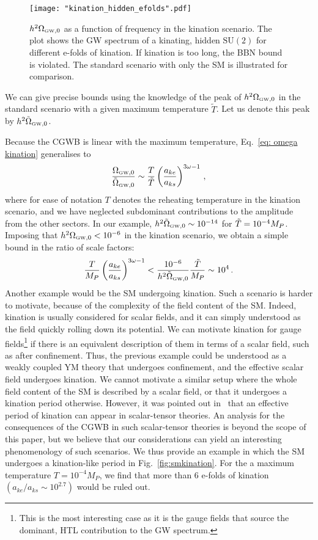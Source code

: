 \documentclass[a4paper,11pt]{article}
\newcommand{\lr}[1]{\left(#1\right)}
\newcommand{\tti}[1]{\text{\tiny{#1}}}
\begin{document}
\begin{figure}[t!]
\centerline{\texttt{[image: "kination\_hidden\_efolds".pdf]}}
\caption{$h^2 \Omega_{\tti{GW},0}$ as a function of frequency in the kination scenario. The plot shows the GW spectrum of a kinating, hidden $\text{SU}(2)$ for different e-folds of kination. If kination is too long, the BBN bound is violated. The standard scenario with only the SM is illustrated for comparison. }
\label{fig: kination and bounds}
\end{figure}

We can give precise bounds using the knowledge of the peak of $h^2\Omega_{\tti{GW},0}$ in the standard scenario with a given maximum temperature $\tilde{T}$. Let us denote this peak by $h^2\tilde{\Omega}_{\tti{GW},0}$.

Because the CGWB is linear with the maximum temperature, Eq.~\eqref{eq: omega kination} generalises to
\begin{equation}\label{eq: omega kination 2}
    \frac{ \Omega_{\tti{GW},0}}{ \tilde{\Omega}_{\tti{GW},0}} \sim \frac{T}{\Tilde{T}}\lr{\frac{a_{ke}}{a_{ks}}}^{3\omega-1} \, ,
\end{equation}
where for ease of notation $T$ denotes the reheating temperature in the kination scenario, and we have neglected subdominant contributions to the amplitude from the other sectors. 
In our example, $h^2\tilde{\Omega}_{\tti{GW},0}\sim 10^{-14}$
for $\Tilde{T}=10^{-4}M_{P}$. 
Imposing that $h^2 \Omega_{\tti{GW},0}<10^{-6}$ in the kination scenario, we obtain a simple bound in the ratio of scale factors:
\begin{equation}
    \frac{T}{M_{P}}\lr{\frac{a_{ke}}{a_{ks}}}^{3\omega-1}< \frac{10^{-6}}{h^2\tilde{\Omega}_{\tti{GW},0}}\frac{\tilde T}{M_{P}}\sim10^4 \, .
\end{equation}
Another example would be the SM undergoing kination. 
Such a scenario is harder to motivate, because of the complexity of the field content of the SM. 
Indeed, kination is usually considered for scalar fields, and it can simply understood as the field quickly rolling down its potential.
We can motivate kination for gauge fields\footnote{This is the most interesting case as it is the gauge fields that source the dominant, HTL contribution to the GW spectrum.} if there is an equivalent description of them in terms of a scalar field, such as after confinement. 
Thus, the previous example could be understood as a weakly coupled YM theory that undergoes confinement, and the effective scalar field undergoes kination.
We cannot motivate a similar setup where the whole field content of the SM is described by a scalar field, or that it undergoes a kination period otherwise.
However, it was pointed out in~\cite{Chowdhury:2022gdc} that an effective period of kination can appear in scalar-tensor theories. 
An analysis for the consequences of the CGWB in such scalar-tensor theories is beyond the scope of this paper, but we believe that our considerations can yield an interesting phenomenology of such scenarios.
We thus provide an example in which the SM undergoes a kination-like period in Fig.~\ref{fig:smkination}. 
For the a maximum temperature $T=10^{-4}M_P$, we find that more than 6 e-folds of kination $\lr{a_{ke}/a_{ks}\sim 10^{2.7}}$ would be ruled out.
\end{document}
